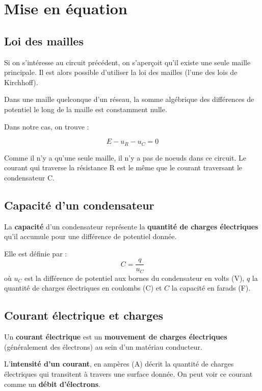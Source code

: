 \documentclass[11pt]{article} %
\begin{document}
\section{Mise en équation}
\subsection{Loi des mailles}

Si on s'intéresse au circuit précédent, on s'aperçoit qu'il existe une seule maille principale. Il est alors possible d'utiliser la loi des mailles (l'une des lois de Kirchhoff).


\begin{mdframed}[style=definitionstyle,frametitle={Rappel : loi des mailles (loi de Kirchhoff)}]

Dans une maille quelconque d'un réseau, la somme algébrique des différences de potentiel le long de la maille est constamment nulle.
\end{mdframed}

Dans notre cas, on trouve :

$$\boxed{E - u_R - u_C = 0}$$

\medskip

Comme il n'y a qu'une seule maille, il n'y a pas de noeuds dans ce circuit. Le courant qui traverse la résistance R est le même que le courant traversant le condensateur C.

\subsection{Capacité d'un condensateur}

La \textbf{capacité} d'un condensateur représente la \textbf{quantité de charges électriques} qu'il accumule pour une différence de potentiel donnée.

Elle est définie par : $$C = \frac{q}{u_C}$$ où $u_C$ est la différence de potentiel aux bornes du condensateur en volts (V), $q$ la quantité de charges électriques en coulombs (C) et $C$ la capacité en farads (F).

\subsection{Courant électrique et charges}

Un \textbf{courant électrique} est un \textbf{mouvement de charges électriques} (généralement des électrons) au sein d'un matériau conducteur.

L'\textbf{intensité d'un courant}, en ampères (A) décrit la quantité de charges électriques qui transitent à travers une surface donnée. On peut voir ce courant comme un \textbf{débit d'électrons}.
\end{document}
